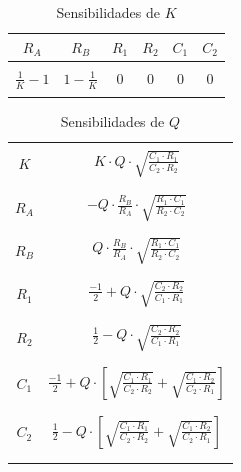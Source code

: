 \begin{table}[H]
    \centering
    \begin{tabular}{c c c c c c}
        $R_A$ & $R_B$ & $R_1$ & $R_2$ & $C_1$ & $C_2$ \\
        \hline \\
        $\frac{1}{K} - 1$ & $1 - \frac{1}{K}$ & $0$ & $0$ & $0$ & $0$ \\
        \\
        \hline
    \end{tabular}
    \caption{Sensibilidades de $K$}
\end{table}

\begin{table}[H]
    \centering
    \begin{tabular}{c | c}
        \hline \\
        $K$ & $K \cdot Q \cdot \sqrt{\frac{C_1 \cdot R_1}{C_2 \cdot R_2}}$ \\
        \\ \hline \\
        $R_A$ & $-Q \cdot \frac{R_B}{R_A} \cdot \sqrt{\frac{R_1 \cdot C_1}{R_2 \cdot C_2}}$ \\
        \\ \hline \\
        $R_B$ & $Q \cdot \frac{R_B}{R_A} \cdot \sqrt{\frac{R_1 \cdot C_1}{R_2 \cdot C_2}}$ \\
        \\ \hline \\
        $R_1$ & $\frac{-1}{2} + Q \cdot \sqrt{\frac{C_2 \cdot R_2}{C_1 \cdot R_1}}$ \\
        \\ \hline \\
        $R_2$ & $\frac{1}{2} - Q \cdot \sqrt{\frac{C_2 \cdot R_2}{C_1 \cdot R_1}}$ \\
        \\ \hline \\
        $C_1$ & $\frac{-1}{2} + Q \cdot \left[ \sqrt{\frac{C_1 \cdot R_1}{C_2 \cdot R_2}} + \sqrt{\frac{C_1 \cdot R_2}{C_2 \cdot R_1}} \right]$ \\
        \\ \hline \\
        $C_2$ & $\frac{1}{2} - Q \cdot \left[ \sqrt{\frac{C_1 \cdot R_1}{C_2 \cdot R_2}} + \sqrt{\frac{C_1 \cdot R_2}{C_2 \cdot R_1}} \right]$ \\
        \\ \hline \\
    \end{tabular}
    \caption{Sensibilidades de $Q$}
\end{table}


